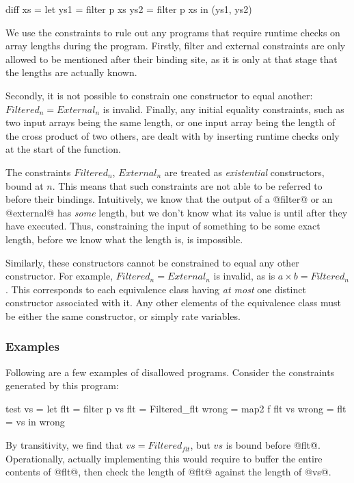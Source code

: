 \begin{code}
 diff xs = let ys1 = filter p xs
               ys2 = filter p xs
           in  (ys1, ys2)
\end{code}




We use the constraints to rule out any programs that require runtime checks on array lengths during the program. Firstly, filter and external constraints are only allowed to be mentioned after their binding site, as it is only at that stage that the lengths are actually known.


Secondly, it is not possible to constrain one constructor to equal another: $Filtered_n = External_n$ is invalid. Finally, any initial equality constraints, such as two input arrays being the same length, or one input array being the length of the cross product of two others, are dealt with by inserting runtime checks only at the start of the function.


The constraints $Filtered_n$, $External_n$ are treated as \emph{existential} constructors, bound at $n$. This means that such constraints are not able to be referred to before their bindings.
Intuitively, we know that the output of a @filter@ or an @external@ has \emph{some} length, but we don't know what its value is until after they have executed. Thus, constraining the input of something to be some exact length, before we know what the length is, is impossible.

Similarly, these constructors cannot be constrained to equal any other constructor. 
For example, $Filtered_n = External_n$ is invalid, as is $a \times b = Filtered_n$.
This corresponds to each equivalence class having \emph{at most} one distinct constructor associated with it. Any other elements of the equivalence class must be either the same constructor, or simply rate variables.

\subsubsection{Examples}
Following are a few examples of disallowed programs.
Consider the constraints generated by this program:
\begin{code}
test vs    =
 let flt   = filter p vs        { flt   = Filtered_flt }
     wrong = map2   f flt vs    { wrong = flt = vs     }
 in  wrong
\end{code}
By transitivity, we find that $vs = Filtered_{flt}$, but $vs$ is bound before @flt@.
Operationally, actually implementing this would require to buffer the entire contents of @flt@, then check the length of @flt@ against the length of @vs@.


